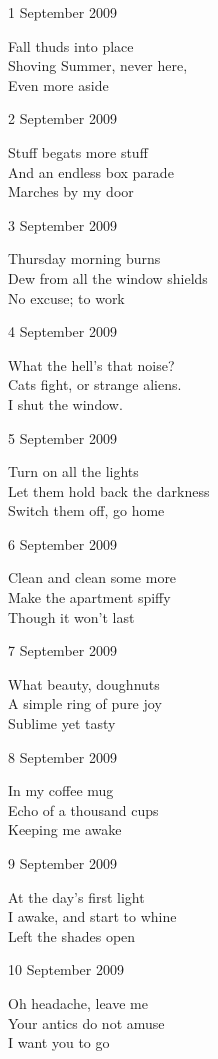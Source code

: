 \documentclass[12pt]{article}
\begin{document}
1 September 2009

Fall thuds into place \\
Shoving Summer, never here, \\
Even more aside

2 September 2009

Stuff begats more stuff \\
And an endless box parade \\
Marches by my door

\newpage

3 September 2009

Thursday morning burns \\
Dew from all the window shields \\
No excuse; to work

4 September 2009

What the hell's that noise? \\
Cats fight, or strange aliens. \\
I shut the window.

5 September 2009

Turn on all the lights \\
Let them hold back the darkness \\
Switch them off, go home

6 September 2009

Clean and clean some more \\
Make the apartment spiffy \\
Though it won't last

7 September 2009

What beauty, doughnuts \\
A simple ring of pure joy \\
Sublime yet tasty

8 September 2009

In my coffee mug \\
Echo of a thousand cups \\
Keeping me awake

9 September 2009

At the day's first light \\
I awake, and start to whine \\
Left the shades open


\newpage

10 September 2009

Oh headache, leave me \\
Your antics do not amuse \\
I want you to go
\end{document}

